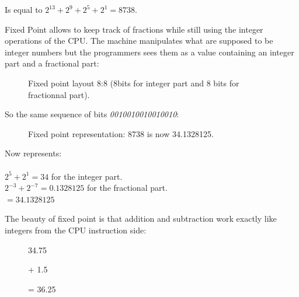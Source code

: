  Is equal to $ 2^{13} + 2^9 + 2^5 + 2^1 =  8738 $.\\
 \par

Fixed Point allows to keep track of fractions while still using the integer operations of the CPU. The machine manipulates what are supposed to be integer numbers but the programmers sees them as a value containing an integer part and a fractional part:\\
\par
\begin{figure}[H]
 \centering
  
 \caption{Fixed point layout 8:8 (8bits for integer part and 8 bits for fractionnal part).} \label{fig:mips}
\end{figure}

So the same sequence of bits \emph{0010010010010010}:
\begin{figure}[H]
 \centering
   
  \caption{Fixed point representation: 8738 is now 34.1328125.} \label{fig:mips}
\end{figure} 

Now represents:\\
\\
$ 2^5 + 2^1 = 34 $ for the integer part.\\
$ 2^{-3}+2^{-7} = 0.1328125 $ for the fractional part.\\
$ = 34.1328125$\\

\bigskip

The beauty of fixed point is that addition and subtraction work exactly like integers from the CPU instruction side:\\




\par
\begin{figure}[H]
 \centering
   

   \caption{34.75} 
\end{figure} 

\begin{figure}[H]
 \centering
   
  \caption{+ 1.5} 
\end{figure} 

\begin{figure}[H]
 \centering
   
  {\caption{= 36.25}}
\end{figure} 
\par
\par


